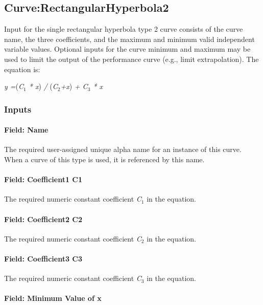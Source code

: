 \subsection{Curve:RectangularHyperbola2}\label{curverectangularhyperbola2}

Input for the single rectangular hyperbola type 2 curve consists of the curve name, the three coefficients, and the maximum and minimum valid independent variable values. Optional inputs for the curve minimum and maximum may be used to limit the output of the performance curve (e.g., limit extrapolation). The equation is:

\emph{y =}(\emph{C\(_{1}\) * x}) \emph{/} (\emph{C\(_{2}\)+x}) \emph{+ C\(_{3}\) * x}

\subsubsection{Inputs}\label{inputs-16-007}

\paragraph{Field: Name}\label{field-name-16-005}

The required user-assigned unique alpha name for an instance of this curve. When a curve of this type is used, it is referenced by this name.

\paragraph{Field: Coefficient1 C1}\label{field-coefficient1-c1-3}

The required numeric constant coefficient \emph{C\(_{1}\)} in the equation.

\paragraph{Field: Coefficient2 C2}\label{field-coefficient2-c2-3}

The required numeric constant coefficient \emph{C\(_{2}\)} in the equation.

\paragraph{Field: Coefficient3 C3}\label{field-coefficient3-c3-3}

The required numeric constant coefficient \emph{C\(_{3}\)} in the equation.

\paragraph{Field: Minimum Value of x}\label{field-minimum-value-of-x-15}

